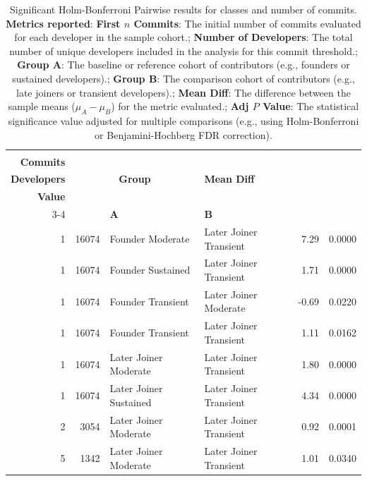 \newpage 
\begin{table}[H]
\centering
\setlength{\tabcolsep}{2pt}
\caption[Significant Holm-Bonferroni Pairwise results for classes]{Significant Holm-Bonferroni Pairwise results for classes and number of commits. \\ \textbf{Metrics reported}:   \textbf{First $n$ Commits}: The initial number of commits evaluated for each developer in the sample cohort.;  \textbf{Number of Developers}: The total number of unique developers included in the analysis for this commit threshold.;  \textbf{Group A}: The baseline or reference cohort of contributors (e.g., founders or sustained developers).;  \textbf{Group B}: The comparison cohort of contributors (e.g., late joiners or transient developers).;  \textbf{Mean Diff}: The difference between the sample means ($\mu_A - \mu_B$) for the metric evaluated.;  \textbf{Adj $P$ Value}: The statistical significance value adjusted for multiple comparisons (e.g., using Holm-Bonferroni or Benjamini-Hochberg FDR correction).
}
\begin{tabular}{r r l l r r}
\toprule
\makecell[t]{\textbf{First $n$}\\\textbf{Commits}} & \makecell[t]{\textbf{Number of}\\\textbf{Developers}} & \multicolumn{2}{c}{\textbf{Group}} & \textbf{Mean Diff} & \makecell[t]{\textbf{Adj $P$}\\\textbf{Value}} \\ 
\cmidrule(lr){3-4}
 &  & \textbf{A} & \textbf{B} &  &  \\ 
\midrule
1 & 16074 & Founder Moderate & Later Joiner Transient & 7.29 & 0.0000 \\ 
1 & 16074 & Founder Sustained & Later Joiner Transient & 1.71 & 0.0000 \\ 
1 & 16074 & Founder Transient & Later Joiner Moderate & -0.69 & 0.0220 \\ 
1 & 16074 & Founder Transient & Later Joiner Transient & 1.11 & 0.0162 \\ 
1 & 16074 & Later Joiner Moderate & Later Joiner Transient & 1.80 & 0.0000 \\ 
1 & 16074 & Later Joiner Sustained & Later Joiner Transient & 4.34 & 0.0000 \\ 
2 & 3054 & Later Joiner Moderate & Later Joiner Transient & 0.92 & 0.0001 \\ 
5 & 1342 & Later Joiner Moderate & Later Joiner Transient & 1.01 & 0.0340 \\ 
\bottomrule
\end{tabular}%
\label{tab:codebase_graph_latex_repository_graph_component_time_series_holm_bonferroni_sig_classes} 
\end{table}

